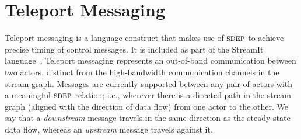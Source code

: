 \section{Teleport Messaging}
\label{sec:teleport}


Teleport messaging is a language construct that makes use of $\textsc{sdep}$
to achieve precise timing of control messages.  It is included as part
of the StreamIt language~\cite{streamitcc}.  Teleport messaging
represents an out-of-band communication between two actors, distinct
from the high-bandwidth communication channels in the stream graph.
Messages are currently supported between any pair of actors with a
meaningful $\textsc{sdep}$ relation; i.e., wherever there is a directed path
in the stream graph (aligned with the direction of data flow) from one
actor to the other.  We say that a {\it downstream} message travels in
the same direction as the steady-state data flow, whereas an {\it
upstream} message travels against it.

